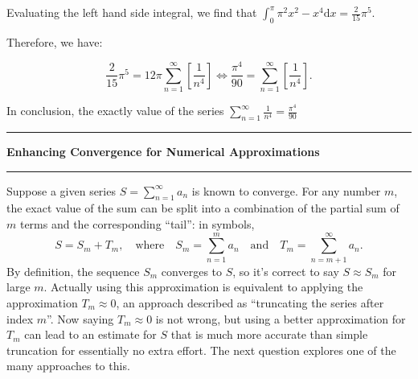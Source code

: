 \documentclass[answers]{exam}
\newcommand\starscore[2]{%
  \pgfmathsetmacro\pgfxa{#1 + 1}%
  \tikzstyle{scorestars}=[star, star points=5, star point ratio=2.5, draw, inner sep=0.12em, anchor=outer point 3]%
  \begin{tikzpicture}[baseline=2pt]
    \foreach \i in {1, ..., #2} {
      \pgfmathparse{\i<=#1 ? "black" : "white"}
      \edef\starcolor{\pgfmathresult}
      \draw (\i*1em, 0) node[name=star\i, scorestars, fill=\starcolor, semithick]  {};
    }
    \pgfmathparse{#1>int(#1) ? int(#1+1) : 0}
    \let\partstar=\pgfmathresult
    \ifnum\partstar>0
      \pgfmathsetmacro\starpart{#1-(int(#1)}
      \path [clip] ($(star\partstar.outer point 3)!(star\partstar.outer point 2)!(star\partstar.outer point 4)$) rectangle 
      ($(star\partstar.outer point 2 |- star\partstar.outer point 1)!\starpart!(star\partstar.outer point 1 -| star\partstar.outer point 5)$);
      \fill (\partstar*1em, 0) node[scorestars, fill=black]  {};
    \fi
  \end{tikzpicture}%
}
\begin{document}
\begin{questions}
\begin{parts}
\begin{solution}
    Evaluating the left hand side integral, we find that $\int^{\pi}_{0} \pi^2 x^2 - x^4 \mathrm dx = \frac{2}{15}\pi^5$.

    Therefore, we have:

    \[\frac{2}{15}\pi^5 = 12 \pi \sum^{\infty}_{n = 1} \left[ \frac{1}{n^4} \right] \iff \frac{\pi^4}{90} = \sum^{\infty}_{n = 1} \left[ \frac{1}{n^4} \right]. \]

    In conclusion, the exactly value of the series $\sum^{\infty}_{n = 1} \frac{1}{n^4} = \frac{\pi^4}{90}$
    
\end{solution}



\end{parts}

\begin{EnvUplevel}
\hrule\smallskip
\noindent
\textbf{Enhancing Convergence for Numerical Approximations}
\medskip\hrule\smallskip

Suppose a given series $S = \sum_{n=1}^\infty a_n$ is known to converge.
For any number $m$, the exact value of the sum can be split into
a combination of the partial sum of $m$ terms
and the corresponding ``tail'': in symbols,
\[
S = S_m + T_m,\quad\text{where}\quad S_m =\sum_{n=1}^m a_n
\quad\text{and}\quad
 T_m = \sum_{n=m+1}^\infty a_n.
\]
By definition, the sequence $S_m$ converges to $S$,
so it's correct to say $S\approx S_m$ for large $m$.
Actually using this approximation is equivalent to applying
the approximation $T_m\approx 0$, 
an approach described as ``truncating the series after index $m$''.
Now saying $T_m\approx 0$ is not wrong,
but using a better approximation for $T_m$ can lead to 
an estimate for $S$ that is much more accurate than simple truncation
for essentially no extra effort.
The next question explores one of the many approaches to this.

\end{EnvUplevel}


\question\label{q:shanks}%

\end{questions}
\end{document}

